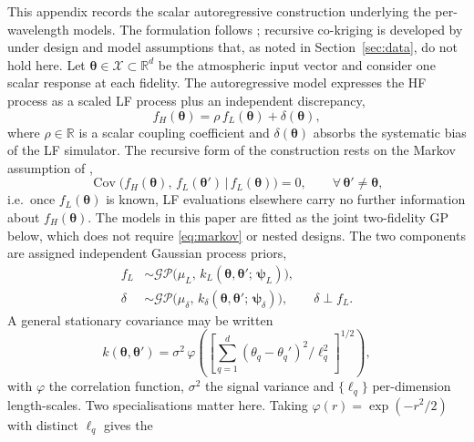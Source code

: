 \documentclass[12pt, letterpaper, oneside]{article}
\begin{document}
This appendix records the scalar autoregressive construction underlying the
per-wavelength models. The formulation follows \citet{KennedyOHagan2000};
recursive co-kriging is developed by \citet{LeGratietGarnier2014} under design
and model assumptions that, as noted in Section~\ref{sec:data}, do not hold
here. Let $\bm\theta\in\mathcal X\subset\mathbb R^d$ be the atmospheric input
vector and consider one scalar response at each fidelity. The autoregressive
model expresses the HF process as a scaled LF process plus an independent
discrepancy,
\begin{equation}
    f_H(\bm\theta) = \rho\, f_L(\bm\theta) + \delta(\bm\theta),
    \label{eq:ar1}
\end{equation}
where $\rho\in\mathbb{R}$ is a scalar coupling coefficient and
$\delta(\bm\theta)$ absorbs the systematic bias of the LF simulator. The
recursive form of the construction rests on the Markov assumption of
\citet{LeGratietGarnier2014},
\begin{equation}
    \operatorname{Cov}\!\big(f_H(\bm\theta),\, f_L(\bm\theta')
    \,\big|\, f_L(\bm\theta)\big) = 0,
    \qquad \forall\,\bm\theta'\neq\bm\theta,
    \label{eq:markov}
\end{equation}
i.e.\ once $f_L(\bm\theta)$ is known, LF evaluations elsewhere carry no further
information about $f_H(\bm\theta)$. The models in this paper are fitted as the
joint two-fidelity GP below, which does not require \eqref{eq:markov} or nested
designs. The two components are assigned independent Gaussian process priors,
\begin{align}
    f_L    &\sim \mathcal{GP}\!\big(\mu_L,\,
              k_L(\bm\theta,\bm\theta';\,\bm\psi_L)\big),
              \label{eq:prior_L}\\
    \delta &\sim \mathcal{GP}\!\big(\mu_\delta,\,
              k_\delta(\bm\theta,\bm\theta';\,\bm\psi_\delta)\big),
              \qquad \delta \perp f_L.
              \label{eq:prior_delta}
\end{align}
A general stationary covariance may be written
\begin{equation}
    k(\bm\theta,\bm\theta')
    = \sigma^{2}\,\varphi\!\left(
      \left[\textstyle\sum_{q=1}^{d}
      (\theta_q-\theta_q')^{2}/\ell_q^{2}\right]^{1/2}\right),
    \label{eq:general-kernel}
\end{equation}
with $\varphi$ the correlation function, $\sigma^{2}$ the signal variance and
$\{\ell_q\}$ per-dimension length-scales. Two specialisations matter here.
Taking $\varphi(r)=\exp(-r^2/2)$ with distinct $\ell_q$ gives the
\end{document}
